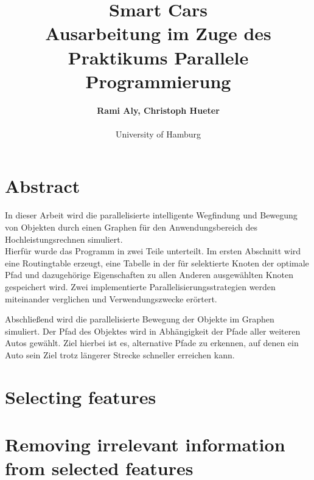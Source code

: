 \documentclass[paper=A4,pagesize=auto,12pt,headinclude=true,footinclude=true,BCOR=0mm,DIV=calc]{scrartcl}
\begin{document}
	
	\title{Smart Cars\\
	\small{Ausarbeitung im Zuge des Praktikums Parallele Programmierung}}
	\author{\textbf{Rami Aly, Christoph Hueter}\\
	\\University of Hamburg}

	\maketitle
	
	\newpage
	
	\section{Abstract}
	In dieser Arbeit wird die parallelisierte intelligente Wegfindung und Bewegung von Objekten durch einen Graphen für den Anwendungsbereich des Hochleistungsrechnen simuliert.\\
	
	Hierfür wurde das Programm in zwei Teile unterteilt. Im ersten Abschnitt wird eine Routingtable erzeugt, eine Tabelle in der für selektierte Knoten der optimale Pfad und dazugehörige Eigenschaften zu allen Anderen ausgewählten Knoten gespeichert wird. Zwei implementierte Parallelisierungsstrategien werden miteinander verglichen und Verwendungszwecke erörtert.
	
	Abschließend wird die parallelisierte Bewegung der Objekte im Graphen simuliert. Der Pfad des Objektes wird in Abhängigkeit der Pfade aller weiteren Autos gewählt. Ziel hierbei ist es, alternative Pfade zu erkennen, auf denen ein Auto sein Ziel trotz längerer Strecke schneller erreichen kann.
	
	
	\newpage
	
	\tableofcontents 
	
	\newpage
	\section{Selecting features} 
	
	
	\section{Removing irrelevant information from selected features}
	\label{sec: dictionary}
	\begin{figure}[H]
	\end{figure}
	
\end{document}
